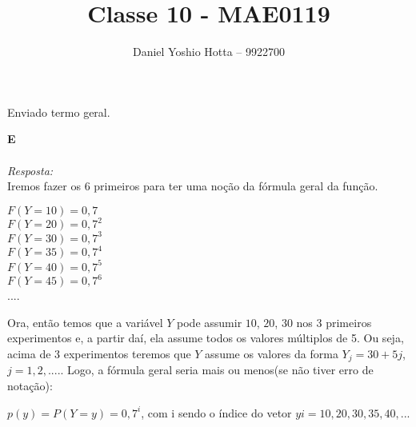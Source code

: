 \documentclass{article}
\begin{document}
	
	\title{Classe 10 - MAE0119}
	\author{Daniel Yoshio Hotta – 9922700}
	
	\maketitle	
	
		Enviado termo geral.
	
	\textbf {E} 
	\\ \\
	\textit {Resposta:} \\
    
    Iremos fazer os 6 primeiros para ter uma noção da fórmula geral da função.
    
    \begin{center}
    	$F(Y = 10) = 0,7$\\
    	$F(Y = 20) = 0,7^2$\\
    	$F(Y = 30) = 0,7^3$\\
    	$F(Y = 35) = 0,7^4$\\
    	$F(Y = 40) = 0,7^5$\\
    	$F(Y = 45) = 0,7^6$\\
    	....\\
    \end{center}
    
    Ora, então temos que a variável $Y$ pode assumir $10$, $20$, $30$ nos 3 primeiros experimentos e, a partir daí, ela assume todos os valores múltiplos de 5. Ou seja, acima de 3 experimentos teremos que $Y$ assume os valores da forma $Y_j = 30 + 5j$, $j = 1, 2, ....$. Logo, a fórmula geral seria mais ou menos(se não tiver erro de notação):
    
    \begin{center}
    	$p(y) = P(Y = y) = 0,7^i $, com i sendo o índice do vetor $yi = {10, 20, 30, 35, 40, ...}$
    \end{center}
    
    
    
	
\end{document}
